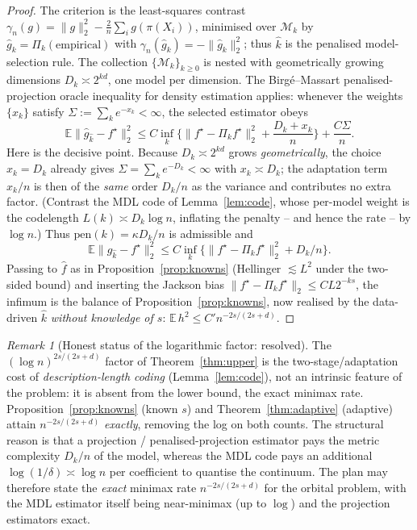 \documentclass[11pt]{article}
\theoremstyle{plain}
\theoremstyle{definition}
\theoremstyle{remark}
\newtheorem{remark}[theorem]{Remark}
\newcommand{\E}{\mathbb{E}}
\begin{document}
\begin{proof}
The criterion is the least-squares contrast $\gamma_n(g)=\|g\|_2^2-\frac2n\sum_i
g(\pi(X_i))$, minimised over $\mathcal M_k$ by $\widehat g_k=\Pi_k(\text{empirical})$
with $\gamma_n(\widehat g_k)=-\|\widehat g_k\|_2^2$; thus $\widehat k$ is the
penalised model-selection rule. The collection $\{\mathcal M_k\}_{k\ge0}$ is nested
with geometrically growing dimensions $D_k\asymp2^{kd}$, one model per dimension.
The Birg\'e--Massart penalised-projection oracle inequality for density estimation
\cite{birgemassart98,massart} applies: whenever the weights $\{x_k\}$ satisfy
$\Sigma:=\sum_k e^{-x_k}<\infty$, the selected estimator obeys
\[
\E\|\widehat g_{\widehat k}-f^\star\|_2^2
\le C\inf_k\Big\{\|f^\star-\Pi_kf^\star\|_2^2+\frac{D_k+x_k}{n}\Big\}+\frac{C\Sigma}{n}.
\]
Here is the decisive point. Because $D_k\asymp2^{kd}$ grows \emph{geometrically},
the choice $x_k=D_k$ already gives $\Sigma=\sum_k e^{-D_k}<\infty$ with $x_k\asymp
D_k$; the adaptation term $x_k/n$ is then of the \emph{same} order $D_k/n$ as the
variance and contributes no extra factor. (Contrast the MDL code of
Lemma~\ref{lem:code}, whose per-model weight is the codelength $L(k)\asymp
D_k\log n$, inflating the penalty -- and hence the rate -- by $\log n$.) Thus
$\mathrm{pen}(k)=\kappa D_k/n$ is admissible and
\[
\E\|\widehat g_{\widehat k}-f^\star\|_2^2\le C\inf_k\big\{\|f^\star-\Pi_kf^\star\|_2^2+D_k/n\big\}.
\]
Passing to $\widehat f$ as in Proposition~\ref{prop:knowns} (Hellinger
$\lesssim L^2$ under the two-sided bound) and inserting the Jackson bias
$\|f^\star-\Pi_kf^\star\|_2\le CL2^{-ks}$, the infimum is the balance of
Proposition~\ref{prop:knowns}, now realised by the data-driven $\widehat k$
\emph{without knowledge of $s$}: $\E\,h^2\le C'n^{-2s/(2s+d)}$.
\end{proof}

\begin{remark}[Honest status of the logarithmic factor: resolved]
The $(\log n)^{2s/(2s+d)}$ factor of Theorem~\ref{thm:upper} is the
two-stage/adaptation cost of \emph{description-length coding}
(Lemma~\ref{lem:code}), not an intrinsic feature of the problem: it is absent from
the lower bound, the exact minimax rate. Proposition~\ref{prop:knowns} (known $s$)
and Theorem~\ref{thm:adaptive} (adaptive) attain $n^{-2s/(2s+d)}$ \emph{exactly},
removing the log on both counts. The structural reason is that a projection /
penalised-projection estimator pays the metric complexity $D_k/n$ of the model,
whereas the MDL code pays an additional $\log(1/\delta)\asymp\log n$ per
coefficient to quantise the continuum. The plan may therefore state the
\emph{exact} minimax rate $n^{-2s/(2s+d)}$ for the orbital problem, with the MDL
estimator itself being near-minimax (up to $\log$) and the projection estimators
exact.
\end{remark}
\end{document}
